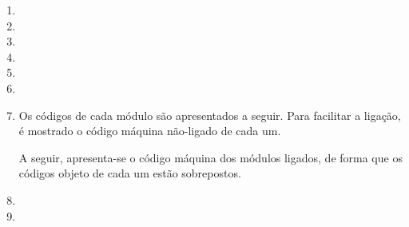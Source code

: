 \begin{enumerate}
    \item
    \item
    \item

    \item 
    
    \item
    \item

    \item
    Os códigos de cada módulo são apresentados a seguir.
    Para facilitar a ligação, é mostrado 
    o código máquina não-ligado de cada um.

    A seguir, apresenta-se o código máquina dos módulos ligados,
    de forma que os códigos objeto de cada um estão sobrepostos.

    \item
    \item
\end{enumerate}